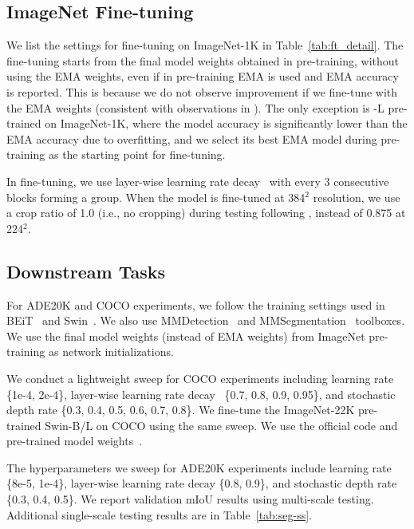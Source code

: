 \documentclass[10pt,twocolumn,letterpaper]{article}
\begin{document}
\subsection{ImageNet Fine-tuning} 
\label{subsec:ft-setting}
We list the settings for fine-tuning on ImageNet-1K in Table~\ref{tab:ft_detail}. The fine-tuning starts from the final model weights obtained in pre-training, without using the EMA weights, even if in pre-training EMA is used and EMA accuracy is reported. This is because we do not observe improvement if we fine-tune with the EMA weights (consistent with observations in \cite{Touvron2020}). The only exception is \cnn{}-L pre-trained on ImageNet-1K, where the model accuracy is significantly lower than the EMA accuracy due to overfitting, and we select its best EMA model during pre-training as the starting point for fine-tuning.

In fine-tuning, we use layer-wise learning rate decay~\cite{Clark2020,Bao2021} with every 3 consecutive blocks forming a group. When the model is fine-tuned at 384$^2$ resolution, we use a crop ratio of 1.0 (i.e., no cropping) during testing following \cite{rw2019timm,Touvron2021GoingDW,swincode}, instead of 0.875 at 224$^2$.



\subsection{Downstream Tasks}
\label{subsec:downstream-setting}

For ADE20K and COCO experiments, we follow the training settings used in BEiT~\cite{Bao2021} and Swin~\cite{Liu2021swin}. We also use MMDetection~\cite{mmdetection} and MMSegmentation~\cite{mmseg2020} toolboxes. We use the final model weights (instead of EMA weights) from ImageNet pre-training as network initializations. 

We conduct a lightweight sweep for COCO experiments including learning rate \{1e-4, 2e-4\}, layer-wise learning rate decay~\cite{Bao2021} \{0.7, 0.8, 0.9, 0.95\}, and stochastic depth rate \{0.3, 0.4, 0.5, 0.6, 0.7, 0.8\}. We fine-tune the ImageNet-22K pre-trained Swin-B/L on COCO using the same sweep. We use the official code and pre-trained model weights~\cite{swindetcode}.

The hyperparameters we sweep for ADE20K experiments include learning rate \{8e-5, 1e-4\}, layer-wise learning rate decay \{0.8, 0.9\}, and stochastic depth rate \{0.3, 0.4, 0.5\}. We report validation mIoU results using multi-scale testing. Additional single-scale testing results are in Table~\ref{tab:seg-ss}.
\end{document}
